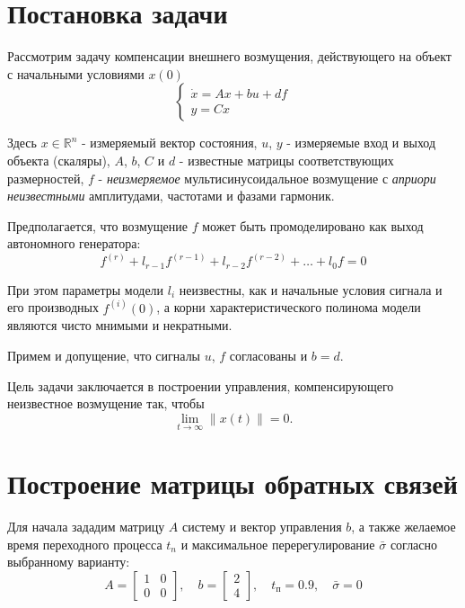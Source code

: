 \documentclass[a4paper,hidelinks,14pt]{extarticle}
\begin{document}
	\section{Постановка задачи}
	Рассмотрим задачу компенсации внешнего возмущения, действующего на объект с начальными условиями $x(0)$
	\begin{equation}
		\begin{cases}
			\dot{x} = Ax + bu + df \\
			y = Cx
		\end{cases}	
	\end{equation}

	Здесь $x \in \mathbb{R}^n$ - измеряемый вектор состояния, $u$, $y$ - измеряемые вход и выход объекта (скаляры), $A$, $b$, $C$ и $d$ - известные матрицы соответствующих размерностей, $f$ - \textit{неизмеряемое} мультисинусоидальное возмущение с \textit{априори неизвестными} амплитудами, частотами и фазами гармоник. 
	
	Предполагается, что возмущение $f$ может быть промоделировано как выход автономного генератора:
	\[
		f^{(r)} + l_{r-1}f^{(r-1)} + l_{r-2}f^{(r-2)} + \ldots + l_0 f = 0
	\]

	При этом параметры модели $l_i$ неизвестны, как и начальные условия сигнала и его производных $f^{(i)}(0)$, а корни характеристического полинома модели являются чисто мнимыми и некратными.

	Примем и допущение, что сигналы $u$, $f$ согласованы и $b = d$.

	Цель задачи заключается в построении управления, компенсирующего неизвестное возмущение так, чтобы
	\begin{equation}
		\lim_{t \to \infty} \|x(t)\| = 0. \label{3}
	\end{equation}

	\section{Построение матрицы обратных связей}
	Для начала зададим матрицу $A$ систему и вектор управления $b$, а также желаемое время переходного процесса $t_n$ и максимальное перерегулирование $\bar{\sigma}$ согласно выбранному варианту:
	\[
		A = \begin{bmatrix}
			1 & 0 \\
			0 & 0
		\end{bmatrix}, \quad b = \begin{bmatrix}
			2 \\ 4
		\end{bmatrix}, \quad t_\text{п} = 0.9, \quad \bar{\sigma} = 0
	\]
\end{document}
